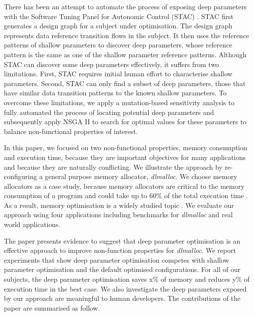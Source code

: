 There has been an attempt to automate the process of exposing deep parameters with the Software Tuning Panel for Autonomic Control (STAC) \cite{Brake:2008:ADS:1370018.1370031}. STAC first generates a design graph for a subject under optimisation. The design graph represents data reference transition flows in the subject. It then uses the reference patterns of shallow parameters to discover deep parameters, whose reference pattern is the same as one of the shallow parameter reference patterns. Although STAC can discover some deep parameters effectively, it suffers from two limitations. First, STAC requires initial human effort to characterise shallow parameters. Second, STAC can only find a subset of deep parameters, those that have similar data transition patterns to the known shallow parameters. To overcome these limitations, we apply a mutation-based sensitivity analysis to fully automated the process of locating potential deep parameters and subsequently apply NSGA II to search for optimal values for these parameters to balance non-functional properties of interest. 

In this paper, we focused on two non-functional properties, memory consumption and execution time, because they are important objectives for many applications and because they are naturally conflicting. We illustrate the approach by re-configuring a general purpose memory allocator, \emph{dlmalloc}. We choose memory allocators as a case study, because memory allocators are critical to the memory consumption of a program and could take up to 60\% of the total execution time \cite{Zorn:1992:EMS:142181.142200}. As a result, memory optimisation is a widely studied topic \cite{Risco-Martin:2009:ODM:1569901.1570116,RiscoMartin2010572}. We evaluate our approach using four applications including benchmarks for \emph{dlmalloc} and real world applications.

The paper presents evidence to suggest that deep parameter optimisation is an effective approach to improve non-function properties for \emph{dlmalloc}. 
We report experiments that show deep parameter optimisation competes with shallow parameter optimisation and the default optimised configurations. For all of our subjects, the deep parameter optimisation saves x\% of memory and reduces y\% of execution time in the best case. We also investigate the deep parameters exposed by our approach are meaningful to human developers. The contributions of the paper are summarised as follow.



